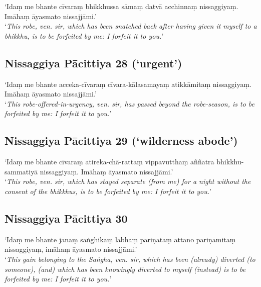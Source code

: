 ‘Idaṃ me bhante cīvaraṃ bhikkhussa sāmaṃ datvā acchinnaṃ nissaggiyaṃ. Imāhaṃ
āyasmato nissajjāmi.’\\
‘\emph{This robe, ven. sir, which has been snatched back after having given it
  myself to a bhikkhu, is to be forfeited by me: I forfeit it to you.}’



\vspace*{-\baselineskip}

\subsection{Nissaggiya Pācittiya 28 (‘urgent’)}

‘Idaṃ me bhante acceka-cīvaraṃ cīvara-kālasamayaṃ atikkāmitaṃ nissaggiyaṃ.
Imāhaṃ āyasmato nissajjāmi.’\\
‘\emph{This robe-offered-in-urgency, ven. sir, has passed beyond the
  robe-season, is to be forfeited by me: I forfeit it to you.}’ 


\subsection{Nissaggiya Pācittiya 29 (‘wilderness abode’)}

‘Idaṃ me bhante cīvaraṃ atireka-chā-rattaṃ vippavutthaṃ aññatra
bhikkhu-sammatiyā nissaggiyaṃ. Imāhaṃ āyasmato nissajjāmi.’\\
‘\emph{This robe, ven. sir, which has stayed separate (from me) for a night
  without the consent of the bhikkhus, is to be forfeited by me: I forfeit it to
  you.}’ 


\subsection{Nissaggiya Pācittiya 30}

‘Idaṃ me bhante jānaṃ saṅghikaṃ lābhaṃ pariṇataṃ attano pariṇāmitaṃ nissaggiyaṃ,
imāhaṃ āyasmato nissajjāmi.’\\
‘\emph{This gain belonging to the Saṅgha, ven. sir, which has been (already)
  diverted (to someone), (and) which has been knowingly diverted to myself
  (instead) is to be forfeited by me: I forfeit it to you.}’

